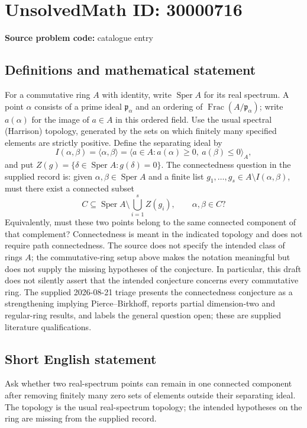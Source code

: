 \documentclass[11pt]{article}
\begin{document}
\section*{UnsolvedMath ID: 30000716}
\textbf{Source problem code:} catalogue entry
\subsection{Definitions and mathematical statement}
For a commutative ring $A$ with identity, write $\operatorname{Sper}A$ for its real spectrum. A point $\alpha$ consists of a prime ideal $\mathfrak p_\alpha$ and an ordering of $\operatorname{Frac}(A/\mathfrak p_\alpha)$; write $a(\alpha)$ for the image of $a\in A$ in this ordered field. Use the usual spectral (Harrison) topology, generated by the sets on which finitely many specified elements are strictly positive. Define the separating ideal by \[I(\alpha,\beta)=\langle\alpha,\beta\rangle=\big\langle a\in A:a(\alpha)\geq0,\ a(\beta)\leq0\big\rangle_A,\] and put $Z(g)=\{\delta\in\operatorname{Sper}A:g(\delta)=0\}$. The connectedness question in the supplied record is: given $\alpha,\beta\in\operatorname{Sper}A$ and a finite list $g_1,\ldots,g_s\in A\setminus I(\alpha,\beta)$, must there exist a connected subset \[C\subseteq\operatorname{Sper}A\setminus\bigcup_{i=1}^s Z(g_i),\qquad \alpha,\beta\in C?\] Equivalently, must these two points belong to the same connected component of that complement? Connectedness is meant in the indicated topology and does not require path connectedness. The source does not specify the intended class of rings $A$; the commutative-ring setup above makes the notation meaningful but does not supply the missing hypotheses of the conjecture. In particular, this draft does not silently assert that the intended conjecture concerns every commutative ring. The supplied 2026-08-21 triage presents the connectedness conjecture as a strengthening implying Pierce--Birkhoff, reports partial dimension-two and regular-ring results, and labels the general question open; these are supplied literature qualifications.
\subsection{Short English statement}
Ask whether two real-spectrum points can remain in one connected component after removing finitely many zero sets of elements outside their separating ideal. The topology is the usual real-spectrum topology; the intended hypotheses on the ring are missing from the supplied record.
\end{document}
